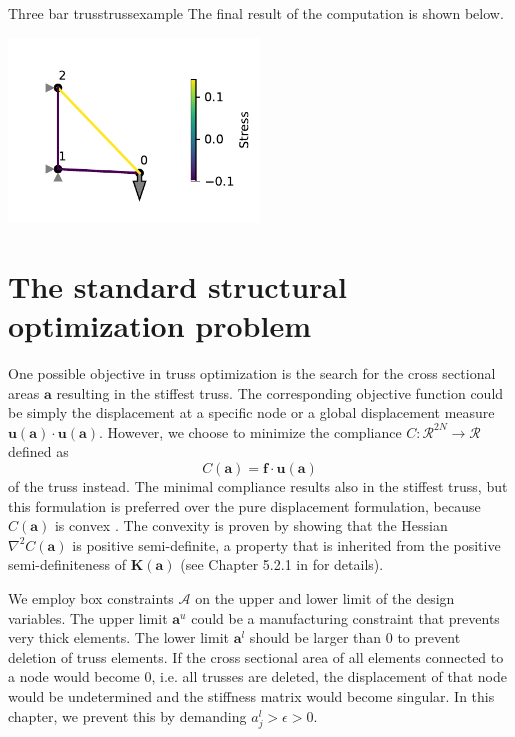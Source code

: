 \begin{example}{Three bar truss}{trussexample}
    The final result of the computation is shown below.
    
    \begin{center}
        \includegraphics[width=0.5\textwidth]{figures/three_bar_truss_solved.pdf}
    \end{center}    
\end{example}


\section{The standard structural optimization problem}
One possible objective in truss optimization is the search for the cross sectional areas $\mathbf{a}$ resulting in the stiffest truss. The corresponding objective function could be simply the displacement at a specific node or a global displacement measure $\mathbf{u} (\mathbf{a}) \cdot \mathbf{u} (\mathbf{a})$. However, we choose to minimize the compliance $C: \mathcal{R}^{2N} \rightarrow \mathcal{R}$ defined as 
\begin{equation}
    C(\mathbf{a}) = \mathbf{f} \cdot \mathbf{u}(\mathbf{a})
\end{equation} 
of the truss instead. The minimal compliance results also in the stiffest truss, but this formulation is preferred over the pure displacement formulation, because $C(\mathbf{a})$ is convex \cite{Svanberg1984}. The convexity is proven by showing that the Hessian $\nabla^2 C(\mathbf{a})$ is positive semi-definite, a property that is inherited from the positive semi-definiteness of $\mathbf{K}(\mathbf{a})$ (see Chapter 5.2.1 in \cite{Christensen2008} for details).

We employ box constraints $\mathcal{A}$ on the upper and lower limit of the design variables. The upper limit $\mathbf{a}^u$ could be a manufacturing constraint that prevents very thick elements. The lower limit $\mathbf{a}^l$ should be larger than $0$ to prevent deletion of truss elements. If the cross sectional area of all elements connected to a node would become $0$, i.e. all trusses are deleted, the displacement of that node would be undetermined and the stiffness matrix would become singular. In this chapter, we prevent this by demanding $a_j^l > \epsilon > 0$.

